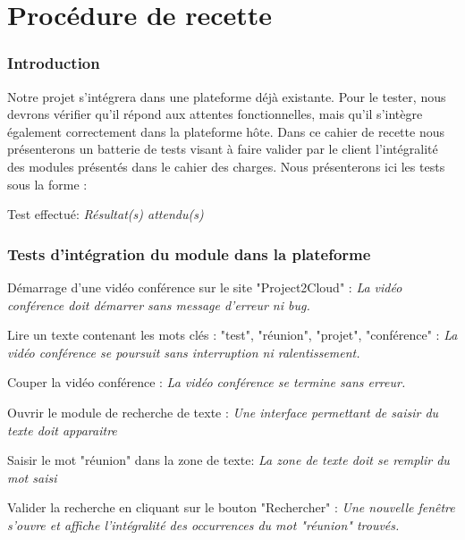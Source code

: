 
	\part{Procédure de recette}
	
	\setcounter{chapter}{1} %
	\setcounter{section}{0} %
	
	\section{Introduction}
	Notre projet s'intégrera dans une plateforme déjà existante. Pour le tester, nous devrons vérifier qu'il répond aux attentes fonctionnelles, mais qu'il s'intègre également correctement dans la plateforme hôte. 
	Dans ce cahier de recette nous présenterons un batterie de tests visant à faire valider par le client l'intégralité des modules présentés dans le cahier des charges. Nous présenterons ici les tests sous la forme :
	\\
	\begin{center}
		Test effectué: \textit{Résultat(s) attendu(s)}
	\end{center}
		
	
	\section{Tests d'intégration du module dans la plateforme}


	Démarrage d'une vidéo conférence sur le site "Project2Cloud" : \textit{La vidéo conférence doit démarrer sans message d'erreur ni bug.}

	Lire un texte contenant les mots clés : "test", "réunion", "projet", "conférence" : \textit{La vidéo conférence se poursuit sans interruption ni ralentissement.}


	Couper la vidéo conférence : \textit{La vidéo conférence se termine sans erreur.}


	Ouvrir le module de recherche de texte : \textit{Une interface permettant de saisir du texte doit apparaitre}


	Saisir le mot "réunion" dans la zone de texte: \textit{La zone de texte doit se remplir du mot saisi}


	Valider la recherche en cliquant sur le bouton "Rechercher" : \textit{Une nouvelle fenêtre s'ouvre et affiche l'intégralité des occurrences du mot "réunion" trouvés.}
	
	